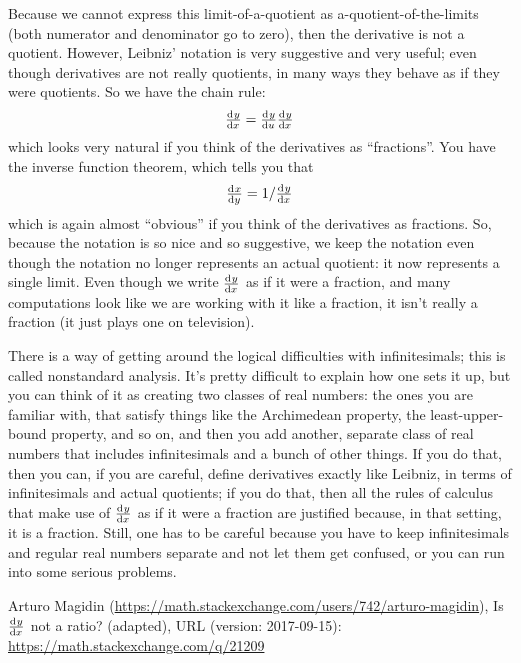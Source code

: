 Because we cannot express this limit-of-a-quotient as a-quotient-of-the-limits (both numerator and denominator go to zero), then the derivative is not a quotient.
However, Leibniz' notation is very suggestive and very useful; even though derivatives are not really quotients, in many ways they behave as if they were quotients. So we have the chain rule:
\begin{displaymath}
  \od{y}{x} = \od{y}{u} \od{y}{x}
\end{displaymath}
which looks very natural if you think of the derivatives as ``fractions''. You have the inverse function theorem, which tells you that
\begin{displaymath}
  \od{x}{y} = 1/\od{y}{x}
\end{displaymath}
which is again almost ``obvious'' if you think of the derivatives as fractions. So, because the notation is so nice and so suggestive, we keep the notation even though the notation no longer represents an actual quotient: it now represents a single limit.  Even though we write $ \od{y}{x} $ as if it were a fraction, and many computations look like we are working with it like a fraction, it isn't really a fraction (it just plays one on television).

There is a way of getting around the logical difficulties with infinitesimals; this is called nonstandard analysis. It's pretty difficult to explain how one sets it up, but you can think of it as creating two classes of real numbers: the ones you are familiar with, that satisfy things like the Archimedean property, the least-upper-bound property, and so on, and then you add another, separate class of real numbers that includes infinitesimals and a bunch of other things. If you do that, then you can, if you are careful, define derivatives exactly like Leibniz, in terms of infinitesimals and actual quotients; if you do that, then all the rules of calculus that make use of $ \od{y}{x} $ as if it were a fraction are justified because, in that setting, it is a fraction. Still, one has to be careful because you have to keep infinitesimals and regular real numbers separate and not let them get confused, or you can run into some serious problems.

\begin{flushright}
Arturo Magidin (\url{https://math.stackexchange.com/users/742/arturo-magidin}), Is $\od{y}{x}$ not a ratio? (adapted), URL (version: 2017-09-15): \url{https://math.stackexchange.com/q/21209}
\end{flushright}

